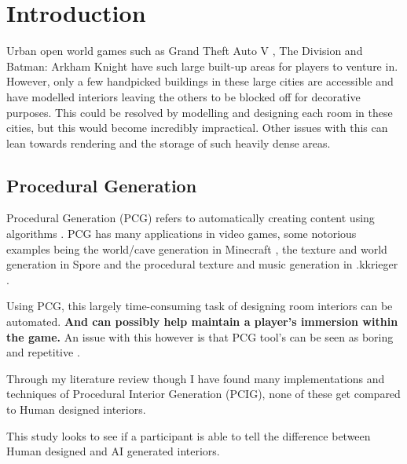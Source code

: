 \section{Introduction}

Urban open world games such as Grand Theft Auto V \cite{game:gta}, The Division \cite{game:division} and Batman: Arkham Knight \cite{game:arkham-knight} have such large built-up areas for players to venture in. However, only a few handpicked buildings in these large cities are accessible and have  modelled interiors leaving the others to be blocked off for decorative purposes. This could be resolved by modelling and designing each room in these cities, but this would become incredibly impractical. Other issues with this can lean towards rendering and the storage of such heavily dense areas.

\subsection*{Procedural Generation}
Procedural Generation (PCG) refers to automatically creating content using algorithms \cite{what-is-pcg}. PCG has many applications in video games, some notorious examples being the world/cave generation in Minecraft \cite{game:minecraft}, the texture\cite{game:spore-texture} and world generation\cite{game:spore-world} in Spore \cite{game:spore} and the procedural texture and music generation in .kkrieger \cite{game:kkreiger}.

Using PCG, this largely time-consuming task of designing room interiors can be automated. \textbf{And can possibly help maintain a player's immersion within the game.} An issue with this however is that PCG tool's can be seen as boring and repetitive \cite{pcg_in_gd}.

Through my literature review though I have found many implementations and techniques of Procedural Interior Generation (PCIG), none of these get compared to Human designed interiors. 
\bigskip

This study looks to see if a participant is able to tell the difference between Human designed and AI generated interiors.

